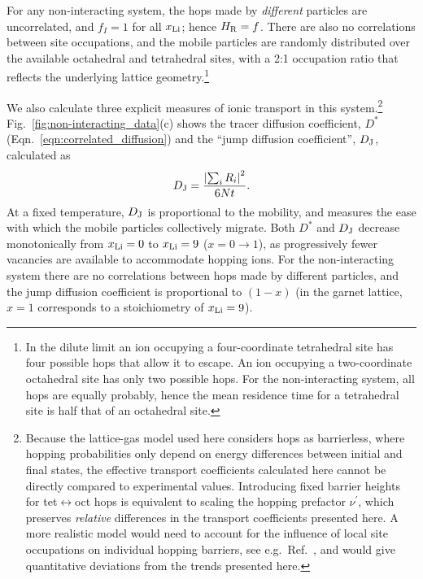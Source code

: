 \documentclass[aps,prb,twocolumn,superscriptaddress,reprint]{revtex4-1}
\newcommand{\xLi}{x_\m{Li}}
\begin{document}
For any non-interacting system, the hops made by \emph{different} particles are uncorrelated, and $f_I=1$ for all $\xLi$; hence $H_{\mathrm{R}}=f$. 
There are also no correlations between site occupations, and the mobile particles are randomly distributed over the available octahedral and tetrahedral sites, with a 2:1 occupation ratio that reflects the underlying lattice geometry.\footnote{In the dilute limit an ion occupying a four-coordinate tetrahedral site has four possible hops that allow it to escape. An ion occupying a two-coordinate octahedral site has only two possible hops. For the non-interacting system, all hops are equally probably, hence the mean residence time for a tetrahedral site is half that of an octahedral site.}

We also calculate three explicit measures of ionic transport in this system.\footnote{Because the lattice-gas model used here considers hops as barrierless, where hopping probabilities only depend on  energy differences between initial and final states, the effective transport coefficients calculated here cannot be directly compared to experimental values. 
Introducing fixed barrier heights for tet$\leftrightarrow$oct hops is equivalent to scaling the hopping prefactor $\nu^\prime$, which preserves \emph{relative} differences in the transport coefficients presented here. 
A more realistic model would need to account for the influence of local site occupations on individual hopping barriers, see e.g.\ Ref.~, and would give quantitative deviations from the trends presented here.} Fig.~\ref{fig:non-interacting_data}(c) shows the tracer diffusion coefficient, $D^*$ (Eqn.~\ref{eqn:correlated_diffusion}) and the ``jump diffusion coefficient'', $D_{\mathrm{J}}$,\cite{VanDerVenEtAl_AccChemRes2013} calculated as
\begin{equation}
  D_{\mathrm{J}}=\frac{\left|\sum_iR_i\right|^2}{6Nt}.
\end{equation}
At a fixed temperature, $D_{\mathrm{J}}$ is proportional to the mobility, and measures the ease with which the mobile particles collectively migrate. 
Both $D^*$ and $D_{\mathrm{J}}$ decrease monotonically from $\xLi=0$ to $\xLi=9$ ($x=0\to1$), as progressively fewer vacancies are available to accommodate hopping ions. 
For the non-interacting system there are no correlations between hops made by different particles, and the jump diffusion coefficient is proportional to $(1-x)$ (in the garnet lattice, $x=1$ corresponds to a stoichiometry of $\xLi=9$).\cite{Kutner_PhysLett1981,VanDerVenEtAl_AccChemRes2013}
\end{document}
